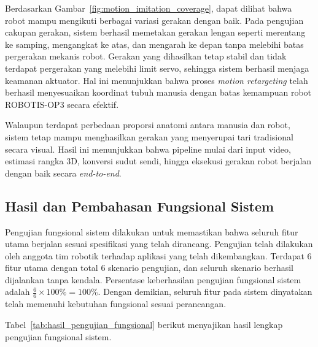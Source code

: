 Berdasarkan Gambar~\ref{fig:motion_imitation_coverage}, dapat dilihat bahwa robot mampu mengikuti berbagai variasi gerakan dengan baik. Pada pengujian cakupan gerakan, sistem berhasil memetakan gerakan lengan seperti merentang ke samping, mengangkat ke atas, dan mengarah ke depan tanpa melebihi batas pergerakan mekanis robot. Gerakan yang dihasilkan tetap stabil dan tidak terdapat pergerakan yang melebihi limit servo, sehingga sistem berhasil menjaga keamanan aktuator. Hal ini menunjukkan bahwa proses \textit{motion retargeting} telah berhasil menyesuaikan koordinat tubuh manusia dengan batas kemampuan robot ROBOTIS-OP3 secara efektif.

Walaupun terdapat perbedaan proporsi anatomi antara manusia dan robot, sistem tetap mampu menghasilkan gerakan yang menyerupai tari tradisional secara visual. Hasil ini menunjukkan bahwa pipeline mulai dari input video, estimasi rangka 3D, konversi sudut sendi, hingga eksekusi gerakan robot berjalan dengan baik secara \textit{end-to-end}.


\subsection{Hasil dan Pembahasan Fungsional Sistem}

Pengujian fungsional sistem dilakukan untuk memastikan bahwa seluruh fitur utama berjalan sesuai spesifikasi yang telah dirancang. Pengujian telah dilakukan oleh anggota tim robotik terhadap aplikasi yang telah dikembangkan. Terdapat 6 fitur utama dengan total 6 skenario pengujian, dan seluruh skenario berhasil dijalankan tanpa kendala. Persentase keberhasilan pengujian fungsional sistem adalah \(\frac{6}{6} \times 100\% = 100\%\). Dengan demikian, seluruh fitur pada sistem dinyatakan telah memenuhi kebutuhan fungsional sesuai perancangan.

Tabel~\ref{tab:hasil_pengujian_fungsional} berikut menyajikan hasil lengkap pengujian fungsional sistem.



